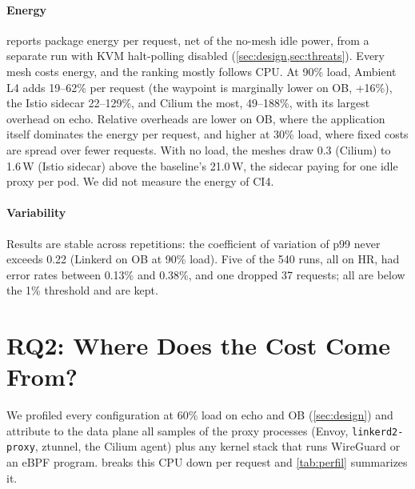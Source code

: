 \paragraph{Energy}
 reports package energy per request, net of the no-mesh idle
power, from a separate run with KVM halt-polling disabled (\cref{sec:design,sec:threats}). Every mesh costs energy, and the ranking mostly follows CPU. At
90\% load, Ambient L4 adds 19--62\% per request (the waypoint is marginally
lower on OB, +16\%), the Istio sidecar 22--129\%,
and Cilium the most, 49--188\%, with its largest overhead on echo. Relative
overheads are lower on OB, where the application itself dominates the energy
per request, and higher at 30\% load, where fixed costs are spread over fewer
requests. With no load, the meshes draw 0.3 (Cilium) to 1.6\,W (Istio sidecar)
above the baseline's 21.0\,W, the sidecar paying for one idle proxy per pod. We did not measure the energy of CI4.

\begin{table}[t]
  \centering
  \caption{Package energy per request (mJ), net of the no-mesh idle power,
           with KVM halt-polling disabled (median of 3 runs).}
  \label{tab:energy}
  \footnotesize
  \setlength{\tabcolsep}{2.5pt}
  
\end{table}

\paragraph{Variability}
Results are stable across repetitions: the coefficient of variation of p99
never exceeds 0.22 (Linkerd on OB at 90\% load). Five of the 540 runs, all on
HR, had error rates between 0.13\% and 0.38\%, and one dropped 37 requests;
all are below the 1\% threshold and are kept.

\section{RQ2: Where Does the Cost Come From?}
\label{sec:rq2}

We profiled every configuration at 60\% load on echo and OB
(\cref{sec:design}) and attribute to the data plane all samples of the proxy
processes (Envoy, \texttt{linkerd2-proxy}, ztunnel, the Cilium agent) plus any
kernel stack that runs WireGuard or an eBPF program. 
breaks this CPU down per request and \cref{tab:perfil} summarizes it.

